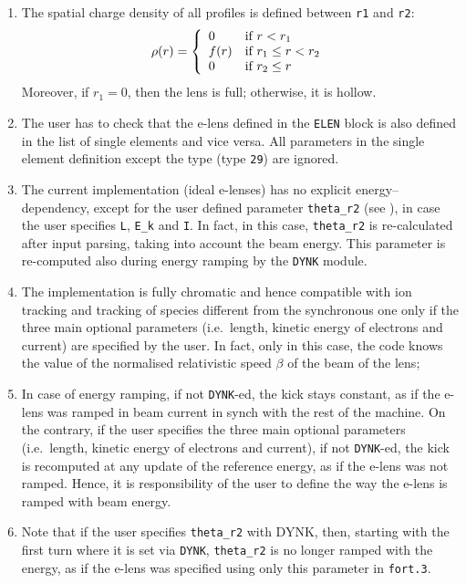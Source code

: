 \begin{enumerate}
\item The spatial charge density of all profiles is defined between \texttt{r1} and \texttt{r2}:
\begin{equation}
  \rho(r)=\left\{
    \begin{array}{ll}
        0 & \mbox{if $r < r_1$} \\
        f(r) & \mbox{if $r_1 \le r < r_2$} \\
        0 & \mbox{if $r_2 \le r$} \\
    \end{array}
    \right. \\
\end{equation}
Moreover, if $r_1=0$, then the lens is full; otherwise, it is hollow.

\item The user has to check that the e-lens defined in the \texttt{ELEN} block is also defined in the list of single elements and vice versa.
  All parameters in the single element definition except the type (type \texttt{29}) are ignored.
\item The current implementation (ideal e-lenses) has no explicit energy--dependency, except for the user defined parameter \texttt{theta\_r2} (see \cite{sixphys}), in case the user specifies \texttt{L}, \texttt{E\_k} and \texttt{I}.
  In fact, in this case, \texttt{theta\_r2} is re-calculated after input parsing, taking into account the beam energy.
  This parameter is re-computed also during energy ramping by the \texttt{DYNK} module.
\item The implementation is fully chromatic and hence compatible with ion tracking and tracking of species different from the synchronous one only if the three main optional parameters (i.e.\ length, kinetic energy of electrons and current) are specified by the user.
  In fact, only in this case, the code knows the value of the normalised relativistic speed $\beta$ of the beam of the lens;
\item In case of energy ramping, if not \texttt{DYNK}-ed, the kick stays constant, as if the e-lens was ramped in beam current in synch with the rest of the machine.
  On the contrary, if the user specifies the three main optional parameters (i.e.~length, kinetic energy of electrons and current), if not \texttt{DYNK}-ed, the kick is recomputed at any update of the reference energy, as if the e-lens was not ramped.
  Hence, it is responsibility of the user to define the way the e-lens is ramped with beam energy.
\item Note that if the user specifies \texttt{theta\_r2} with DYNK, then, starting with the first turn where it is set via \texttt{DYNK}, \texttt{theta\_r2} is no longer ramped with the energy, as if the e-lens was specified using only this parameter in \texttt{fort.3}.

\end{enumerate}
